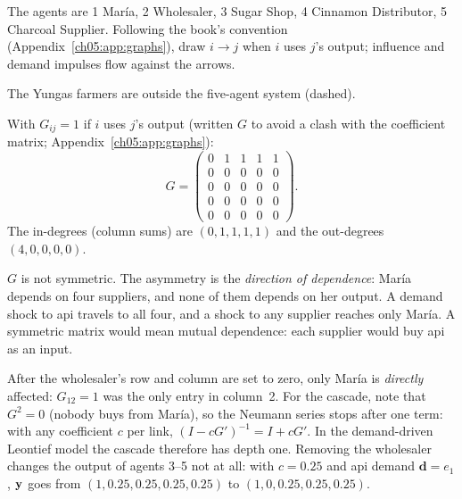 \documentclass[../solutions_manual.tex]{subfiles}
\begin{document}

 The agents are 1 Mar\'ia, 2 Wholesaler, 3 Sugar Shop, 4 Cinnamon Distributor, 5 Charcoal Supplier. Following the book's convention (Appendix~\ref{ch05:app:graphs}), draw $i \to j$ when $i$ uses $j$'s output; influence and demand impulses flow against the arrows.
\begin{center}
\end{center}
The Yungas farmers are outside the five-agent system (dashed).

 With $G_{ij} = 1$ if $i$ uses $j$'s output (written $G$ to avoid a clash with the coefficient matrix; Appendix~\ref{ch05:app:graphs}):
\[
G = \begin{pmatrix} 0 & 1 & 1 & 1 & 1\\ 0&0&0&0&0\\ 0&0&0&0&0\\ 0&0&0&0&0\\ 0&0&0&0&0\end{pmatrix}.
\]
The in-degrees (column sums) are $(0, 1, 1, 1, 1)$ and the out-degrees $(4, 0, 0, 0, 0)$.

 $G$ is not symmetric. The asymmetry is the \emph{direction of dependence}: Mar\'ia depends on four suppliers, and none of them depends on her output. A demand shock to api travels to all four, and a shock to any supplier reaches only Mar\'ia. A symmetric matrix would mean mutual dependence: each supplier would buy api as an input.

 After the wholesaler's row and column are set to zero, only Mar\'ia is \emph{directly} affected: $G_{12} = 1$ was the only entry in column~2. For the cascade, note that $G^2 = 0$ (nobody buys from Mar\'ia), so the Neumann series stops after one term: with any coefficient $c$ per link, $(I - cG')^{-1} = I + cG'$. In the demand-driven Leontief model the cascade therefore has depth one. Removing the wholesaler changes the output of agents 3--5 not at all: with $c = 0.25$ and api demand $\mathbf{d} = e_1$, $\mathbf{y}$ goes from $(1, 0.25, 0.25, 0.25, 0.25)$ to $(1, 0, 0.25, 0.25, 0.25)$.
\end{document}

